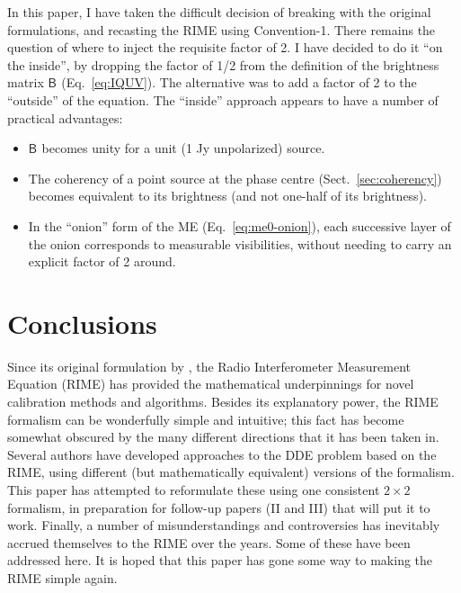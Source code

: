 \documentclass{aa}
\newcommand{\coh}[2]{\mathsf{{#1}}_{{#2}}}
\begin{document}
In this paper, I have taken the difficult decision of breaking with the original formulations, and recasting the RIME using Convention-1. There remains the question of where to inject the requisite factor of 2. I have decided to do it ``on the inside'', by dropping the factor of 1/2 from the \citet{ME4} definition of the brightness matrix $\coh{B}{}$ (Eq.~\ref{eq:IQUV}). The alternative was to add a factor of 2 to the ``outside'' of the equation. The ``inside'' approach appears to have a number of practical advantages:

\begin{itemize}
\item $\coh{B}{}$ becomes unity for a unit (1 Jy unpolarized) source.
\item The coherency of a point source at the phase centre (Sect.~\ref{sec:coherency}) becomes equivalent to its brightness (and not one-half of its brightness).
\item In the ``onion'' form of the ME (Eq.~\ref{eq:me0-onion}), each successive layer of the onion corresponds to measurable visibilities, without needing to carry an explicit factor of 2 around.
\end{itemize}

\section{Conclusions}

Since its original formulation by \citet{ME1}, the Radio Interferometer Measurement Equation (RIME) has provided the mathematical underpinnings for novel calibration methods and algorithms. Besides its explanatory power, the RIME formalism can be wonderfully simple and intuitive; this fact has become somewhat obscured by the many different directions that it has been taken in. Several authors have developed approaches to the DDE problem based on the RIME, using different (but mathematically equivalent) versions of the formalism. This paper has attempted to reformulate these using one consistent $2\times2$ formalism, in preparation for follow-up papers (II and III) that will put it to work. Finally, a number of misunderstandings and controversies has inevitably accrued themselves to the RIME over the years. Some of these have been addressed here. It is hoped that this paper has gone some way to making the RIME simple again. 




\end{document}
